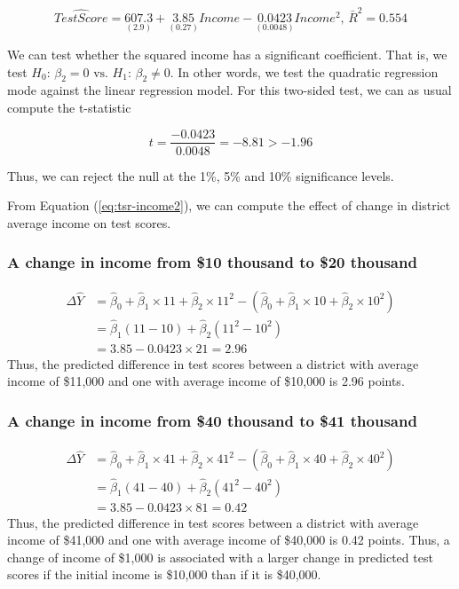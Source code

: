 \documentclass[a4paper,11pt]{article}
\begin{document}
\begin{equation}
\label{eq:tsr-income2}
\widehat{TestScore} = \underset{\displaystyle (2.9)}{607.3} +
\underset{\displaystyle (0.27)}{3.85}Income - \underset{\displaystyle (0.0048)}{0.0423}Income^2,\, \bar{R}^2 = 0.554
\end{equation}


We can test whether the squared income has a significant
coefficient. That is, we test \(H_0:\, \beta_2 = 0 \text{ vs. } H_1:\,
\beta_2 \neq 0\). In other words, we test the quadratic regression mode
against the linear regression model. For this two-sided test, we can
as usual compute the t-statistic

\[ t = \frac{-0.0423}{0.0048} = -8.81 > -1.96 \]

Thus, we can reject the null at the 1\%, 5\% and 10\% significance levels.

From Equation (\ref{eq:tsr-income2}), we can compute the effect of
change in district average income on test scores.
\subsubsection*{A change in income from \$10 thousand to \$20 thousand}
\label{sec:org6fd9759}
\begin{equation*}
\begin{split}
\Delta \hat{Y} &= \hat{\beta}_0 + \hat{\beta}_1 \times 11 + \hat{\beta}_2 \times 11^2 - (\hat{\beta}_0 + \hat{\beta}_1 \times 10 + \hat{\beta}_2 \times 10^2) \\
&= \hat{\beta}_1 (11 - 10) + \hat{\beta}_2(11^2 - 10^2) \\
& = 3.85 - 0.0423 \times 21 = 2.96
\end{split}
\end{equation*}
Thus, the predicted difference in test scores between a district with
average income of \$11,000 and one with average income of \$10,000 is
2.96 points.

\subsubsection*{A change in income from \$40 thousand to \$41 thousand}
\label{sec:org7107981}
\begin{equation*}
\begin{split}
\Delta \hat{Y} &= \hat{\beta}_0 + \hat{\beta}_1 \times 41 + \hat{\beta}_2 \times 41^2 - (\hat{\beta}_0 + \hat{\beta}_1 \times 40 + \hat{\beta}_2 \times 40^2) \\
&= \hat{\beta}_1 (41 - 40) + \hat{\beta}_2(41^2 - 40^2) \\
& = 3.85 - 0.0423 \times 81 = 0.42
\end{split}
\end{equation*}
Thus, the predicted difference in test scores between a district with
average income of \$41,000 and one with average income of \$40,000 is
0.42 points. Thus, a change of income of \$1,000 is associated with a
larger change in predicted test scores if the initial income is
\$10,000 than if it is \$40,000.
\end{document}
